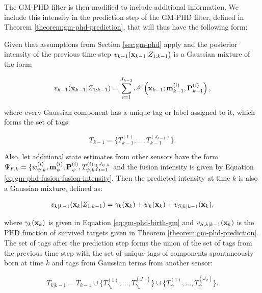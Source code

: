 The GM-PHD filter is then modified to include additional information. We include this intensity in the prediction step of the GM-PHD filter, defined in Theorem \ref{theorem:gm-phd-prediction}, that will thus have the following form:

\begin{theorem}\label{theorem:gm-phd-fusion-prediction}
    Given that assumptions from Section \ref{sec:gm-phd} apply and the posterior intensity of the previous time step $v_{k-1}(\vecat{x}{k-1} | Z_{1:k-1})$ is a Gaussian mixture of the form:

    \begin{equation}
        v_{k-1}(\vecat{x}{k-1} | Z_{1:k-1}) = \sum_{i=1}^{J_{k-1}}
        \mathscr{N}\left(\vecat{x}{k-1}; \vecat{m}{k-1}^{(i)}, \vecat{P}{k-1}^{(i)}\right),
    \end{equation}

    \noindent where every Gaussian component has a unique tag or label assigned to it, which forms the set of tags:

    \begin{equation}
        T_{k-1} = \{ T_{k-1}^{(1)}, \ldots, T_{k-1}^{(J_{k-1})} \}.
    \end{equation}

    \noindent Also, let additional state estimates from other sensors have the form $\Psi_{F, k} = \{ w_{\psi, k}^{(i)}, \svecat{m}{\psi}{(i)}, \svecat{P}{\psi}{(i)}, \allowbreak T_{\psi, k}^{(i)} \}_{i=1}^{J_{\psi, k}}$ and the fusion intensity is given by Equation \ref{eq:gm-phd-fusion-fusion-intensity}. Then the predicted intensity at time $k$ is also a Gaussian mixture, defined as:

    \begin{equation}
        v_{k|k-1}(\vecat{x}{k} | Z_{1:k-1}) = \gamma_k(\vecat{x}{k}) + \psi_k(\vecat{x}{k}) + v_{S, k|k-1}(\vecat{x}{k}),
    \end{equation}

    \noindent where $\gamma_k(\vecat{x}{k})$ is given in Equation \ref{eq:gm-phd-birth-gm} and $v_{S, k|k-1}(\vecat{x}{k})$ is the PHD function of survived targets given in Theorem \ref{theorem:gm-phd-prediction}. The set of tags after the prediction step forms the union of the set of tags from the previous time step with the set of unique tags of components spontaneously born at time $k$ and tags from Gaussian terms from another sensor:

    \begin{equation}
        T_{k|k-1} = T_{k-1} \cup \{ T_{\gamma_k}^{(1)}, \ldots, T_{\gamma_k}^{(J_{\gamma_k})} \}
        \cup \{ T_{\psi}^{(1)}, \ldots, T_{\psi}^{(J_{\psi})} \}.
    \end{equation}
\end{theorem}

